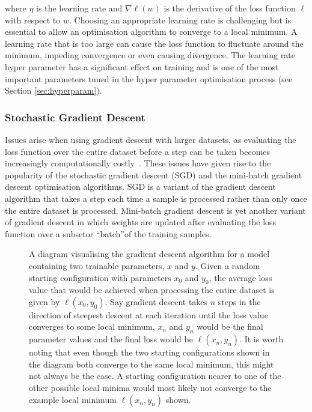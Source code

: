 \noindent
where $\eta$ is the learning rate and $\nabla\ell(w)$ is the derivative of the loss function $\ell$ with respect to $w$. Choosing an appropriate learning rate is challenging but is essential to allow an optimisation algorithm to converge to a local minimum. A learning rate that is too large can cause the loss function to fluctuate around the minimum, impeding convergence or even causing divergence. The learning rate hyper parameter has a significant effect on training and is one of the most important parameters tuned in the hyper parameter optimisation process (see Section \ref{sec:hyperparam}).


\subsubsection{Stochastic Gradient Descent}

Issues arise when using gradient descent with larger datasets, as evaluating the loss function over the entire dataset before a step can be taken becomes increasingly computationally costly~\cite{gdbad}. These issues have given rise to the popularity of the stochastic gradient descent (SGD) and the mini-batch gradient descent optimisation algorithms. SGD is a variant of the gradient descent algorithm that takes a step each time a sample is processed rather than only once the entire dataset is processed. Mini-batch gradient descent is yet another variant of gradient descent in which weights are updated after evaluating the loss function over a subset\textemdash or ``batch''\textemdash of the training samples.

\begin{figure}[t]
    \centering
    
    \caption{A diagram visualising the gradient descent algorithm for a model containing two trainable parameters, $x$ and $y$. Given a random starting configuration with parameters $x_0$ and $y_0$, the average loss value that would be achieved when processing the entire dataset is given by $\ell(x_0, y_0)$. Say gradient descent takes $n$ steps in the direction of steepest descent at each iteration until the loss value converges to some local minimum, $x_n$ and $y_n$ would be the final parameter values and the final loss would be $\ell(x_n, y_n)$. It is worth noting that even though the two starting configurations shown in the diagram both converge to the same local minimum, this might not always be the case. A starting configuration nearer to one of the other possible local minima would most likely not converge to the example local minimum $\ell(x_n, y_n)$ shown.}
    \label{fig:gd}
\end{figure}

